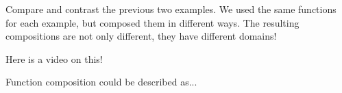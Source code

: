 \documentclass{ximera}
\begin{document}
Compare and contrast the previous two examples.  We used the same
functions for each example, but composed them in different ways.  The resulting
compositions are not only different, they have different domains!

Here is a video on this!




\begin{problem}
    Function composition could be described as...
    \begin{multipleChoice}
    \end{multipleChoice}
\end{problem}
\end{document}
